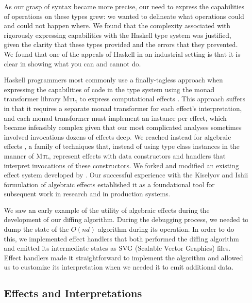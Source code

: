 \documentclass[acmsmall,fleqn]{acmart}
\begin{document}
As our grasp of syntax became more precise, our need to express the
capabilities of operations on these types grew: we wanted to delineate what
operations could and could not happen where. We found that the complexity
associated with rigorously expressing capabilities with the Haskell type system
was justified, given the clarity that these types provided and the errors that
they prevented. We found that one of the appeals of Haskell in an industrial
setting is that it is clear in showing what you can and cannot do.

\newcommand{\mtl}{\textsc{Mtl}}

Haskell programmers most commonly use a finally-tagless approach
\cite{Carette07finallytagless} when expressing
the capabilities of code in the type system using the monad transformer library
\mtl{}, to express computational effects \cite{Jones95Functional}. This approach
suffers in that it requires a separate monad transformer for each effect’s
interpretation, and each monad transformer must implement an instance per
effect, which became infeasibly complex given that our most complicated analyses
sometimes involved invocations dozens of effects deep. We reached instead for
algebraic effects \cite{Plotkin01Semantics}, a family of techniques that,
instead of using type class instances in the manner of \mtl{}, represent effects
with data constructors and handlers that interpret invocations of these
constructors. We forked and modified an existing effect system developed by
\citet{freersimple16}. Our successful experience with the Kiselyov and Ishii
formulation of algebraic effects established it as a foundational tool for
subsequent work in research and in production systems.

We saw an early example of the utility of algebraic effects during the
development of our diffing algorithm. During the debugging process, we needed to
dump the state of the $O(nd)$ algorithm during its operation. In order to do
this, we implemented effect handlers that both performed the diffing algorithm
and emitted its intermediate states as SVG (Scalable Vector Graphics) files.
Effect handlers made it straightforward to implement the algorithm and allowed
us to customize its interpretation when we needed it to emit additional data.

\subsection{Effects and Interpretations} \label{sec:eff}
\end{document}
